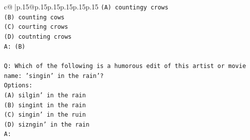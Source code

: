 \documentclass{article}
\begin{document}
{\begin{supertabular}{c@{$\;$}|p{.15\linewidth}@{}p{.15\linewidth}p{.15\linewidth}p{.15\linewidth}p{.15\linewidth}p{.15\linewidth}}
{{{\texttt{(A) countingy crows} \\
\texttt{(B) counting cows} \\
\texttt{(C) courting crows} \\
\texttt{(D) coutnting crows} \\
\texttt{A: (B)} \\
\\ 
\texttt{Q: Which of the following is a humorous edit of this artist or movie name: 'singin' in the rain'?} \\
\texttt{Options:} \\
\texttt{(A) silgin' in the rain} \\
\texttt{(B) singint in the rain} \\
\texttt{(C) singin' in the ruin} \\
\texttt{(D) sizngin' in the rain} \\
\texttt{A:} \\
            }
        }
    }
     \\ \\


\end{supertabular}}
\end{document}
